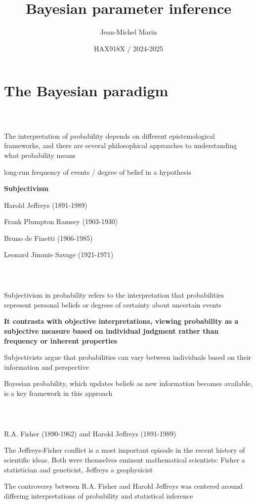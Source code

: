 \documentclass[notes,professionalfont,11pt,usenames,dvipsnames]{beamer}
\title[Bayesian parameter inference]{Bayesian parameter inference}
\author[Jean-Michel Marin]{Jean-Michel Marin}
\institute[IMAG]{University of Montpellier \\
Faculty of Sciences}
\date[HAX918X]{HAX918X / 2024-2025}
\newcommand\justify{\rightskip0pt \leftskip0pt}
\newenvironment{slide}
{\begin{frame}[environment=slide]
\frametitle{\insertsection \\ \insertsubsection}\justify\setlength{\parskip}{0.5cm}\vspace{-1cm}}
{\end{frame}}
\begin{document}
\frame{\titlepage}

\frame{\tableofcontents} 

\section{The Bayesian paradigm}

\begin{slide}

The interpretation of probability depends on different epistemological frameworks, and there are several philosophical approaches to understanding what probability means

long-run frequency of events /
degree of belief in a hypothesis

\textbf{Subjectivism}

Harold Jeffreys (1891-1989)

Frank Plumpton Ramsey (1903-1930)

Bruno de Finetti (1906-1985)

Leonard Jimmie Savage (1921-1971)


\end{slide}

\begin{slide}

Subjectivism in probability refers to the interpretation that probabilities represent personal beliefs or degrees of certainty about uncertain events

{\color{red} \bf It contrasts with objective interpretations, viewing probability as a subjective measure based on individual judgment rather than frequency or inherent properties}

Subjectivists argue that probabilities can vary between individuals based on their information and perspective 

Bayesian probability, which updates beliefs as new information becomes available, is a key framework in this approach

\end{slide}

\begin{slide}

R.A. Fisher (1890-1962) and Harold Jeffreys (1891-1989) 

The Jeffreys-Fisher conflict is a most important episode in the recent history of scientific ideas. Both were themselves eminent mathematical scientists: Fisher a statistician and geneticist, Jeffreys a geophysicist 

The controversy between R.A. Fisher and Harold Jeffreys was centered around differing interpretations of probability and statistical inference 

\end{slide}
\end{document}
